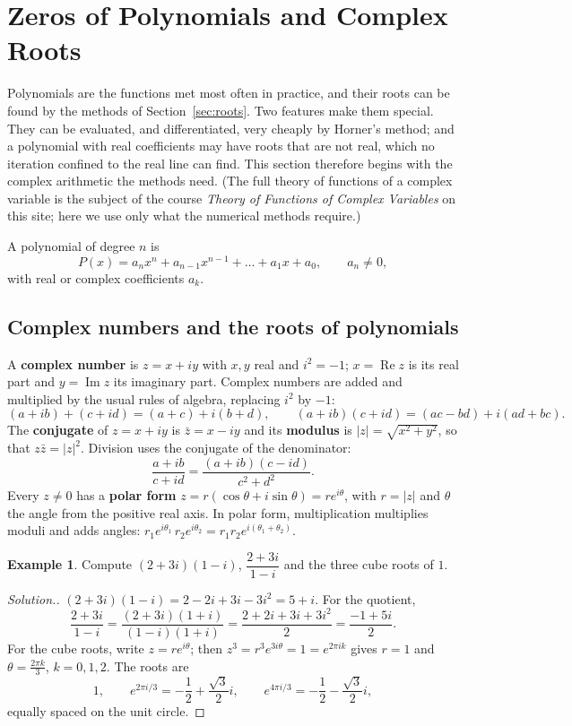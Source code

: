 \documentclass[11pt,a4paper]{article}
\numberwithin{equation}{section}
\theoremstyle{definition}
\newtheorem{exa}[thm]{Example}
\newenvironment{solution}
  {\renewcommand{\qedsymbol}{}\begin{proof}[\textit{Solution}.]}
  {\end{proof}}
\begin{document}
\section{Zeros of Polynomials and Complex Roots}
\label{sec:poly}

Polynomials are the functions met most often in practice, and their roots can be found by the methods of Section~\ref{sec:roots}. Two
features make them special. They can be evaluated, and differentiated, very cheaply by Horner's method; and a polynomial with real
coefficients may have roots that are not real, which no iteration confined to the real line can find. This section therefore begins with
the complex arithmetic the methods need. (The full theory of functions of a complex variable is the subject of the course
\emph{Theory of Functions of Complex Variables} on this site; here we use only what the numerical methods require.)

A polynomial of degree $n$ is
$$P(x) = a_nx^n+a_{n-1}x^{n-1}+\dots+a_1x+a_0,\qquad a_n\neq0,$$
with real or complex coefficients $a_k$.


\subsection{Complex numbers and the roots of polynomials}
\label{sec:complex}

A \textbf{complex number} is $z = x+iy$ with $x,y$ real and $i^2 = -1$; $x = \operatorname{Re}z$ is its real part and $y = \operatorname{Im}z$ its
imaginary part. Complex numbers are added and multiplied by the usual rules of algebra, replacing $i^2$ by $-1$:
$$(a+ib)+(c+id) = (a+c)+i(b+d),\qquad (a+ib)(c+id) = (ac-bd)+i(ad+bc).$$
The \textbf{conjugate} of $z = x+iy$ is $\bar z = x-iy$ and its \textbf{modulus} is $|z| = \sqrt{x^2+y^2}$, so that $z\bar z = |z|^2$. Division
uses the conjugate of the denominator:
$$\frac{a+ib}{c+id} = \frac{(a+ib)(c-id)}{c^2+d^2}.$$
Every $z\neq0$ has a \textbf{polar form} $z = r(\cos\theta+i\sin\theta) = re^{i\theta}$, with $r = |z|$ and $\theta$ the angle from the
positive real axis. In polar form, multiplication multiplies moduli and adds angles: $r_1e^{i\theta_1}\,r_2e^{i\theta_2} =
r_1r_2e^{i(\theta_1+\theta_2)}$.

\begin{exa}
Compute $(2+3i)(1-i)$, $\dfrac{2+3i}{1-i}$ and the three cube roots of $1$.
\end{exa}

\begin{solution}
$(2+3i)(1-i) = 2-2i+3i-3i^2 = 5+i$. For the quotient,
$$\frac{2+3i}{1-i} = \frac{(2+3i)(1+i)}{(1-i)(1+i)} = \frac{2+2i+3i+3i^2}{2} = \frac{-1+5i}{2} .$$
For the cube roots, write $z = re^{i\theta}$; then $z^3 = r^3e^{3i\theta} = 1 = e^{2\pi ik}$ gives $r = 1$ and $\theta = \frac{2\pi k}{3}$,
$k = 0,1,2$. The roots are
$$1,\qquad e^{2\pi i/3} = -\frac12+\frac{\sqrt3}{2}i,\qquad e^{4\pi i/3} = -\frac12-\frac{\sqrt3}{2}i,$$
equally spaced on the unit circle.
\end{solution}
\end{document}
